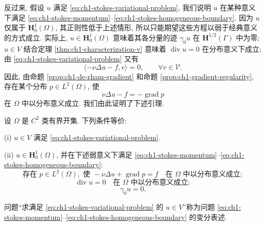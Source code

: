 反过来, 假设 $u$ 满足 \eqref{eq:ch1-stokes-variational-problem}, 我们说明 $u$ 在某种意义下满足 \eqref{eq:ch1-stokes-momentum}--\eqref{eq:ch1-stokes-homogeneous-boundary}. 因为 $u$ 仅属于 $\mathbf H_0^1(\Omega)$, 其正则性低于上述情形, 所以只能期望这些方程以弱于经典意义的方式成立. 实际上, $u\in\mathbf H_0^1(\Omega)$ 意味着其各分量的迹 $\gamma_0u$ 在 $\mathbf H^{1/2}(\Gamma)$ 中为零; $u\in V$ 结合定理 \ref{thm:ch1-characterization-v} 意味着 $\operatorname{div}u=0$ 在分布意义下成立; 由 \eqref{eq:ch1-stokes-variational-problem} 又有
\[
\langle-\nu\Delta u-f,v\rangle=0,\qquad\forall v\in\mathcal V.
\]
因此, 由命题 \ref{prop:ch1-de-rham-gradient} 和命题 \ref{prop:ch1-gradient-regularity}, 存在某个分布 $p\in L^2(\Omega)$, 使
\[
\nu\Delta u-f=-\operatorname{grad}p
\]
在 $\Omega$ 中以分布意义成立. 我们由此证明了下述引理.

\begin{Lemma}
\label{lem:ch1-stokes-variational-equivalence}
设 $\Omega$ 是 $C^2$ 类有界开集. 下列条件等价:

(i) $u\in V$ 满足 \eqref{eq:ch1-stokes-variational-problem}.

(ii) $u\in\mathbf H_0^1(\Omega)$, 并在下述弱意义下满足 \eqref{eq:ch1-stokes-momentum}--\eqref{eq:ch1-stokes-homogeneous-boundary}:
\begin{equation}
\text{存在 }p\in L^2(\Omega),\text{ 使 }-\nu\Delta u+\operatorname{grad}p=f
\quad\text{在 }\Omega\text{ 中以分布意义成立};
\label{eq:ch1-stokes-weak-momentum}
\end{equation}
\begin{equation}
\operatorname{div}u=0\quad\text{在 }\Omega\text{ 中以分布意义成立};
\label{eq:ch1-stokes-weak-incompressibility}
\end{equation}
\begin{equation}
\gamma_0u=0.
\label{eq:ch1-stokes-weak-boundary}
\end{equation}
\end{Lemma}

\begin{Definition}
\label{def:ch1-stokes-variational-formulation}
问题``求满足 \eqref{eq:ch1-stokes-variational-problem} 的 $u\in V$''称为问题 \eqref{eq:ch1-stokes-momentum}--\eqref{eq:ch1-stokes-homogeneous-boundary} 的变分表述.
\end{Definition}

